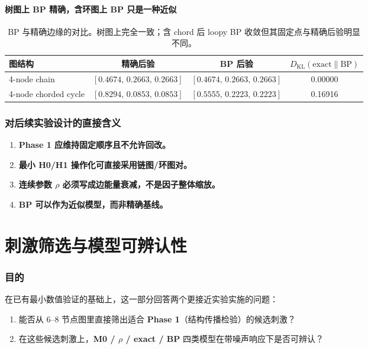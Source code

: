 \documentclass[11pt,a4paper]{ctexart}
\begin{document}
\subsection{树图上 BP 精确，含环图上 BP 只是一种近似}

\begin{table}[ht]
\centering\small
\begin{tabular}{lccc}
\toprule
图结构 & 精确后验 & BP 后验 & $D_{\mathrm{KL}}(\text{exact}\|\text{BP})$ \\
\midrule
4-node chain & $[0.4674,\,0.2663,\,0.2663]$ & $[0.4674,\,0.2663,\,0.2663]$ & 0.00000 \\
4-node chorded cycle & $[0.8294,\,0.0853,\,0.0853]$ & $[0.5555,\,0.2223,\,0.2223]$ & 0.16916 \\
\bottomrule
\end{tabular}
\caption{BP 与精确边缘的对比。树图上完全一致；含 chord 后 loopy BP 收敛但其固定点与精确后验明显不同。}
\end{table}

\section{对后续实验设计的直接含义}

\begin{enumerate}
    \item \textbf{Phase 1 应维持固定顺序且不允许回改。}
    \item \textbf{最小 H0/H1 操作化可直接采用链图/环图对。}
    \item \textbf{连续参数 $\rho$ 必须写成边能量衰减，不是因子整体缩放。}
    \item \textbf{BP 可以作为近似模型，而非精确基线。}
\end{enumerate}

\part{刺激筛选与模型可辨认性}

\section{目的}

在已有最小数值验证的基础上，这一部分回答两个更接近实验实施的问题：
\begin{enumerate}
    \item 能否从 6--8 节点图里直接筛出适合 \textbf{Phase 1}（结构传播检验）的候选刺激？
    \item 在这些候选刺激上，\textbf{M0 / $\rho$ / exact / BP} 四类模型在带噪声响应下是否可辨认？
\end{enumerate}
\end{document}
